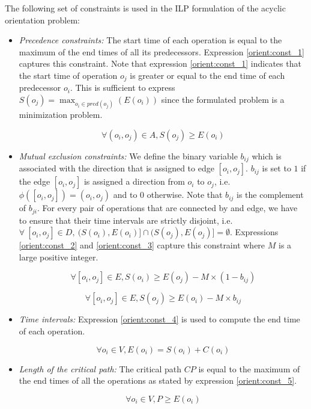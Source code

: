 The following set of constraints is used in the ILP formulation of the acyclic orientation problem:

\begin{itemize}

\item \textit{Precedence constraints:} The start time of each operation is equal to the maximum of the end times of all its predecessors. Expression \ref{orient:const_1} captures this constraint. Note that expression \ref{orient:const_1} indicates that the start time of operation $o_j$ is greater or equal to the end time of each predecessor $o_i$. This is sufficient to express $S(o_j) = \max_{o_i \in pred(o_j)}(E(o_i))$ since the formulated problem is a minimization problem.

\begin{equation}
\forall (o_i,o_j) \in A, S(o_j) \geq E(o_i)
\label{orient:const_1}
\end{equation}

\item \textit{Mutual exclusion constraints:} We define the binary variable $b_{ij}$ which is associated with the direction that is assigned to edge $[o_i,o_j]$. $b_{ij}$ is set to $1$ if the edge $[o_i,o_j]$ is assigned a direction from $o_i$ to $o_j$, i.e. $\phi([o_i,o_j]) = (o_i,o_j)$ and to $0$ otherwise. Note that $b_{ij}$ is the complement of $b_{ji}$. For every pair of operations that are connected by and edge, we have to ensure that their time intervals are strictly disjoint, i.e. $\forall\ [o_i,o_j] \in D,\  (S(o_i), E(o_i)] \cap (S(o_j), E(o_j)] = \emptyset$. Expressions \ref{orient:const_2} and \ref{orient:const_3} capture this constraint where $M$ is a large positive integer.

\begin{equation}
\forall [o_i,o_j] \in E, S(o_i) \geq E(o_j) - M \times (1-b_{ij})
\label{orient:const_2}
\end{equation} 

\begin{equation}
\forall [o_i,o_j] \in E, S(o_j) \geq E(o_i) - M \times b_{ij}
\label{orient:const_3}
\end{equation}

\item \textit{Time intervals:} Expression \ref{orient:const_4} is used to compute the end time of each operation.

\begin{equation}
\forall o_i \in V, E(o_i) = S(o_i) + C(o_i)
\label{orient:const_4}
\end{equation} 

\item \textit{Length of the critical path:} The critical path $CP$ is equal to the maximum of the end times of all the operations as stated by expression \ref{orient:const_5}.

\begin{equation}
\forall o_i \in V, P \geq E(o_i)
\label{orient:const_5}
\end{equation}

\end{itemize}

